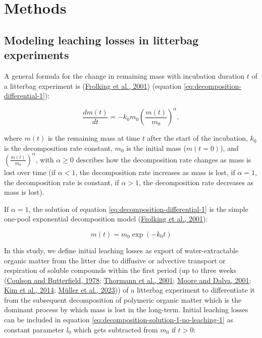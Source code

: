 \documentclass[
  12pt,
]{article}
\begin{document}
\hypertarget{methods}{%
\section{Methods}\label{methods}}

\hypertarget{out-methods-1}{%
\subsection{Modeling leaching losses in litterbag experiments}\label{out-methods-1}}

A general formula for the change in remaining mass with incubation duration \(t\) of a litterbag experiment is (\protect\hyperlink{ref-Frolking.2001}{Frolking et al., 2001}) (equation \eqref{eq:decomposition-differential-1}):

\begin{equation}
\frac{dm(t)}{dt} = -k_0 m_0 \left(\frac{m(t)}{m_0}\right)^\alpha,
\label{eq:decomposition-differential-1}
\end{equation}

where \(m(t)\) is the remaining mass at time \(t\) after the start of the incubation, \(k_0\) is the decomposition rate constant, \(m_0\) is the initial mass (\(m(t = 0)\)), and \(\left(\frac{m(t)}{m_0}\right)^\alpha\), with \(\alpha \ge 0\) describes how the decomposition rate changes as mass is lost over time (if \(\alpha<1\), the decomposition rate increases as mass is lost, if \(\alpha=1\), the decomposition rate is constant, if \(\alpha>1\), the decomposition rate decreases as mass is lost).

If \(\alpha = 1\), the solution of equation \eqref{eq:decomposition-differential-1} is the simple one-pool exponential decomposition model (\protect\hyperlink{ref-Frolking.2001}{Frolking et al., 2001}):

\begin{equation}
m(t) = m_0 \exp(-k_0 t)
\label{eq:decomposition-solution-1-no-leaching-1}
\end{equation}

In this study, we define initial leaching losses as export of water-extractable organic matter from the litter due to diffusive or advective transport or respiration of soluble compounds within the first period (up to three weeks (\protect\hyperlink{ref-Coulson.1978}{Coulson and Butterfield, 1978}; \protect\hyperlink{ref-Thormann.2001}{Thormann et al., 2001}; \protect\hyperlink{ref-Moore.2001}{Moore and Dalva, 2001}; \protect\hyperlink{ref-Kim.2014}{Kim et al., 2014}; \protect\hyperlink{ref-Muller.2023}{Müller et al., 2023})) of a litterbag experiment to differentiate it from the subsequent decomposition of polymeric organic matter which is the dominant process by which mass is lost in the long-term. Initial leaching losses can be included in equation \eqref{eq:decomposition-solution-1-no-leaching-1} as constant parameter \(l_0\) which gets subtracted from \(m_0\) if \(t>0\):
\end{document}
